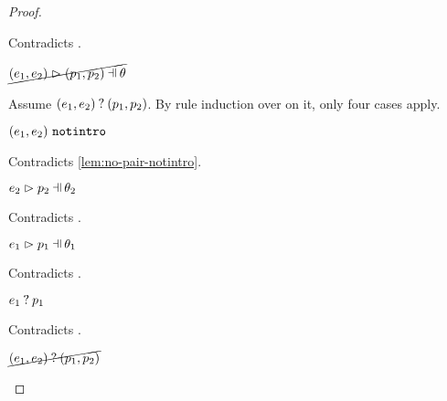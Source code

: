 \begin{proof}
\begin{byCases}
\begin{byCases}
\begin{byCases}
\begin{byCases}
\begin{pfsteps*}
                \end{pfsteps*}
                Contradicts .
            \end{byCases}
            \begin{pfsteps*}
            \item $\cancel{\hpatmatch{\hpair{e_1}{e_2}}{\hpair{p_1}{p_2}}{\theta}}$ 
            \end{pfsteps*}
            Assume $(e_1 , e_2) \mathbin{?} (p_1 , p_2)$. By rule induction over  on it, only four cases apply.
            \begin{byCases}
            \item[\text{(\ref{rule:MMNotIntro})}]
                \begin{pfsteps*}
                \item $(e_1 , e_2) ~\mathtt{notintro}$ 
                \end{pfsteps*}
                Contradicts \autoref{lem:no-pair-notintro}.
            \item[\text{(\ref{rule:MMPairL})}]
                \begin{pfsteps*}
                \item $\hpatmatch{e_2}{p_2}{\theta_2}$ 
                \end{pfsteps*}
                Contradicts .
            \item[\text{(\ref{rule:MMPairR})}]
                \begin{pfsteps*}
                \item $\hpatmatch{e_1}{p_1}{\theta_1}$ 
                \end{pfsteps*}
                Contradicts .
            \item[\text{(\ref{rule:MMPair})}]
                \begin{pfsteps*}
                \item $e_1 \mathbin{?} p_1$ 
                \end{pfsteps*}
                Contradicts .
            \end{byCases}
            \begin{pfsteps*}
            \item $\cancel{(e_1 , e_2) \mathbin{?} (p_1 , p_2)}$ 
            \end{pfsteps*}
        \end{byCases}
    \end{byCases}
    
\end{byCases}
\resetpfcounter
\end{proof}

